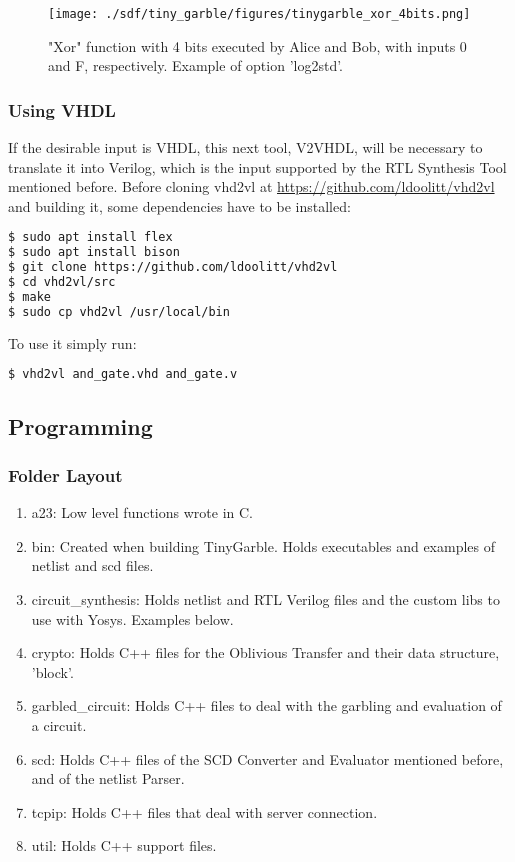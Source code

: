 \begin{refsection}
\begin{figure}[H]
	\centering
	\texttt{[image: ./sdf/tiny\_garble/figures/tinygarble\_xor\_4bits.png]}
    \caption{"Xor" function with 4 bits executed by Alice and Bob, with inputs 0 and F, respectively. Example of option 'log2std'.}\label{fig:tinygarble_xor}
\end{figure}

\subsubsection{Using VHDL}

If the desirable input is VHDL, this next tool, V2VHDL, will be necessary to translate it into Verilog, which is the input supported by the RTL Synthesis Tool mentioned before.
Before cloning vhd2vl at \url{https://github.com/ldoolitt/vhd2vl} and building it, some dependencies have to be installed:

\begin{lstlisting}[caption={Installation of VHD2VL}, language=bash, captionpos=b]
$ sudo apt install flex
$ sudo apt install bison
$ git clone https://github.com/ldoolitt/vhd2vl
$ cd vhd2vl/src
$ make
$ sudo cp vhd2vl /usr/local/bin
\end{lstlisting}

To use it simply run:

\begin{lstlisting}[caption={Translation of VHDL file into Verilog}, language=bash, captionpos=b]
$ vhd2vl and_gate.vhd and_gate.v	
\end{lstlisting}

\newpage

\subsection{Programming}

\subsubsection{Folder Layout}

\begin{enumerate}
\item a23: Low level functions wrote in C.
\item bin: Created when building TinyGarble. Holds executables and examples of netlist and scd files.
\item circuit\_synthesis: Holds netlist and RTL Verilog files and the custom libs to use with Yosys. Examples below.
\item crypto: Holds C++ files for the Oblivious Transfer and their data structure, 'block'.
\item garbled\_circuit: Holds C++ files to deal with the garbling and evaluation of a circuit.
\item scd:  Holds C++ files of the SCD Converter and Evaluator mentioned before, and of the netlist Parser.
\item tcpip: Holds C++ files that deal with server connection.
\item util: Holds C++ support files.
\end{enumerate}


\end{refsection}
